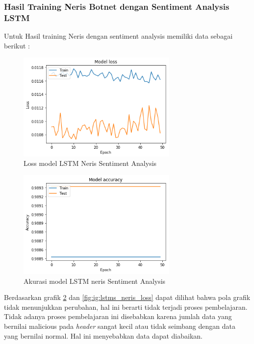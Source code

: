 \documentclass[./skripsi.tex]{subfiles}
\begin{document}
\subsubsection{Hasil Training Neris Botnet dengan Sentiment Analysis LSTM}
\par Untuk Hasil training Neris dengan sentiment analysis memiliki data sebagai berikut :

\begin{figure}%
    \centering
    \includegraphics[width=0.7\textwidth]{public/assets/img/lstms_neris_loss.png}
    \caption{Loss model LSTM Neris Sentiment Analysis}
    \label{fig:lstms_neris_loss}
\end{figure}
\begin{figure}%
	\centering
    \includegraphics[width=0.7\textwidth] {public/assets/img/lstms_neris_acc.png}
    \caption{Akurasi model LSTM neris Sentiment Analysis}
    \label{fig:lstms_neris_acc}
\end{figure}

\par Berdasarkan grafik \ref{fig:lstms_neris_acc} dan \ref{fig:ig:lstms_neris_loss} dapat dilihat bahwa pola grafik tidak menunjukkan perubahan, hal ini berarti tidak terjadi proses pembelajaran. Tidak adanya proses pembelajaran ini disebabkan karena jumlah data yang bernilai malicious pada \textit{header} sangat kecil atau tidak seimbang dengan data yang bernilai normal. Hal ini menyebabkan data dapat diabaikan.
\end{document}
